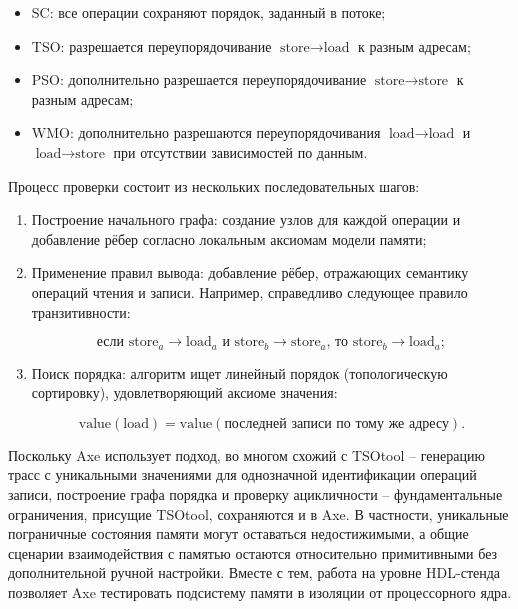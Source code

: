 \begin{itemize}
  \item SC: все операции сохраняют порядок, заданный в потоке;
  \item TSO: разрешается переупорядочивание $\text{store} \rightarrow
    \text{load}$ к разным адресам;
  \item PSO: дополнительно разрешается переупорядочивание
    $\text{store} \rightarrow \text{store}$ к разным адресам;
  \item WMO: дополнительно разрешаются переупорядочивания
    $\text{load} \rightarrow \text{load}$ и $\text{load} \rightarrow
    \text{store}$ при отсутствии зависимостей по данным.
\end{itemize}

Процесс проверки состоит из нескольких последовательных шагов:

\begin{enumerate}
  \item Построение начального графа: создание узлов для
    каждой операции и добавление рёбер согласно локальным аксиомам
    модели памяти;
  \item Применение правил вывода: добавление рёбер,
    отражающих семантику операций чтения и записи. Например,
    справедливо следующее правило транзитивности:

    \begin{equation}
      \text{если } \text{store}_a \rightarrow \text{load}_a \text{ и
      } \text{store}_b \rightarrow \text{store}_a \text{, то }
      \text{store}_b \rightarrow \text{load}_a;
      \nonumber
    \end{equation}

  \item Поиск порядка: алгоритм ищет линейный порядок (топологическую
    сортировку), удовлетворяющий аксиоме значения:

    \begin{equation}
      \text{value}(\text{load}) = \text{value}(\text{последней записи
      по тому же адресу}).
      \nonumber
    \end{equation}
\end{enumerate}

Поскольку Axe использует подход, во многом схожий с TSOtool --
генерацию трасс с уникальными значениями для однозначной
идентификации операций записи, построение графа порядка и проверку
ацикличности -- фундаментальные ограничения, присущие TSOtool,
сохраняются и в Axe. В частности, уникальные пограничные состояния
памяти могут оставаться недостижимыми, а общие сценарии
взаимодействия с памятью остаются относительно примитивными без
дополнительной ручной настройки. Вместе с тем, работа на уровне
HDL-стенда позволяет Axe тестировать подсистему памяти в изоляции от
процессорного ядра.

